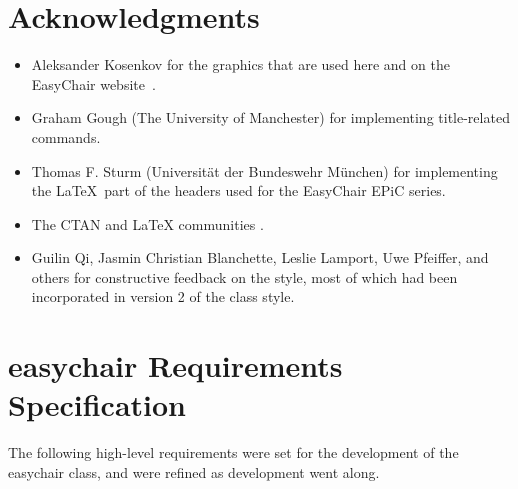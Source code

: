 \documentclass{easychair}
\newcommand{\easychair}{\textsf{easychair}}
\begin{document}
\section{Acknowledgments}
\label{sect:acks}

\begin{itemize}
\item
Aleksander Kosenkov for the graphics that are used here and on the EasyChair 
website~\cite{easychair}.

\item
Graham Gough (The University of Manchester) for implementing title-related
commands.

\item
Thomas F. Sturm (Universit\"at der Bundeswehr M\"unchen) for implementing the
\LaTeX\ part of the headers used for the EasyChair EPiC series.

\item
The CTAN \cite{ctan} and {\LaTeX} communities \cite{texniccenter,miktex}.

\item
Guilin Qi, Jasmin Christian Blanchette, Leslie Lamport, Uwe Pfeiffer,
and others for constructive feedback on the style, most of which had been
incorporated in version 2 of the class style.
\end{itemize}

\label{sect:bib}

%
%
%


\appendix
\section{{\easychair} Requirements Specification}
\label{sect:easychair-requirements}

The following high-level requirements were set for the development of 
the {\easychair} class, and were refined as development went along.
\end{document}
